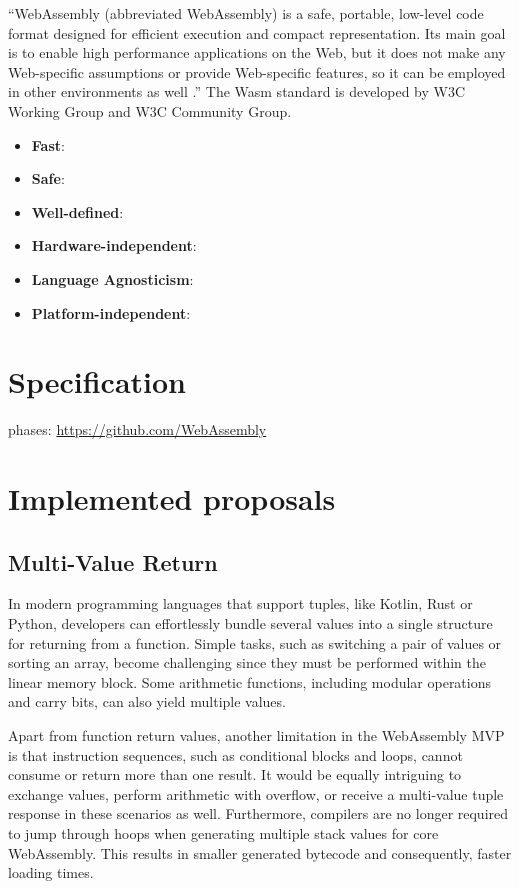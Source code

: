 “WebAssembly (abbreviated \Gls{WebAssembly}) is a safe, portable, low-level code format designed for efficient execution and compact representation. Its main goal is to enable high performance applications on the Web, but it does not make any Web-specific assumptions or provide Web-specific features, so it can be employed in other environments as well \cite[p.~1]{webassemblycommunitygroup_2023_webassembly}.”
The Wasm standard is developed by W3C Working Group and W3C Community Group. 
\begin{itemize}
  \item \textbf{Fast}: 
  \item \textbf{Safe}:
  \item \textbf{Well-defined}:
  \item \textbf{Hardware-independent}:
  \item \textbf{Language Agnosticism}:
  \item \textbf{Platform-independent}:
\end{itemize}

\section{Specification}
\label{sec:specification}

phases: \href{https://github.com/WebAssembly/meetings/blob/main/process/phases.md}{https://github.com/WebAssembly}


\section{Implemented proposals}
\label{sec:implemented-proposals}

\subsection{Multi-Value Return}
In modern programming languages that support tuples, like Kotlin, Rust or Python, developers can effortlessly bundle several values into a single structure for returning from a function. Simple tasks, such as switching a pair of values or sorting an array, become challenging since they must be performed within the linear memory block. Some arithmetic functions, including modular operations and carry bits, can also yield multiple values.

Apart from function return values, another limitation in the WebAssembly MVP is that instruction sequences, such as conditional blocks and loops, cannot consume or return more than one result. It would be equally intriguing to exchange values, perform arithmetic with overflow, or receive a multi-value tuple response in these scenarios as well. Furthermore, compilers are no longer required to jump through hoops when generating multiple stack values for core WebAssembly. This results in smaller generated bytecode and consequently, faster loading times.

